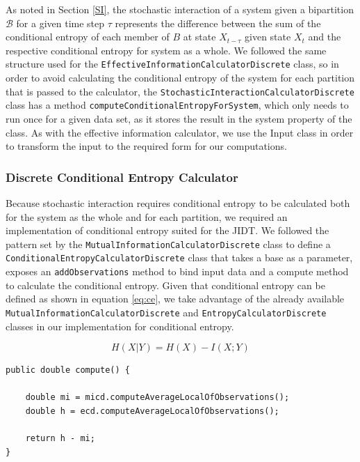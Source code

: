 \documentclass[a4paper,11pt]{article}
\begin{document}
As noted in Section \ref{SI}, the stochastic interaction of a system given a bipartition $\mathcal{B}$ for a given time step $\tau$ represents the difference between the sum of the conditional entropy of each member of $B$ at state $X_{t-\tau}$ given state $X_t$ and the respective conditional entropy for system as a whole. We followed the same structure used for the \texttt{EffectiveInformationCalculatorDiscrete} class, so in order to avoid calculating the conditional entropy of the system for each partition that is passed to the calculator, the \texttt{StochasticInteractionCalculatorDiscrete} class has a method \texttt{computeConditionalEntropyForSystem}, which only needs to run once for a given data set, as it stores the result in the system property of the class. As with the effective information calculator, we use the Input class in order to transform the input to the required form for our computations.

\subsubsection{Discrete Conditional Entropy Calculator}

Because stochastic interaction requires conditional entropy to be calculated both for the system as the whole and for each partition, we required an implementation of conditional entropy suited for the JIDT. We followed the pattern set by the \texttt{MutualInformationCalculatorDiscrete} class to define a \texttt{ConditionalEntropyCalculatorDiscrete} class that takes a base as a parameter, exposes an \texttt{addObservations} method to bind input data and a compute method to calculate the conditional entropy. Given that conditional entropy can be defined as shown in equation \ref{eq:ce}, we take advantage of the already available \texttt{MutualInformationCalculatorDiscrete} and \texttt{EntropyCalculatorDiscrete} classes in our implementation for conditional entropy.

\begin{equation} \label{eq:ce}
H(X|Y) = H(X) - I(X; Y)
\end{equation}

\begin{verbatim}
public double compute() {

	double mi = micd.computeAverageLocalOfObservations();
	double h = ecd.computeAverageLocalOfObservations();

	return h - mi;
}
\end{verbatim}
\end{document}
